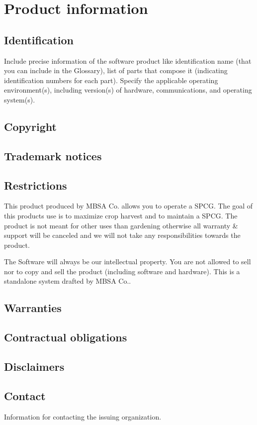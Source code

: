 \chapter{Product information}
\vspace{-6em}


\section{Identification}
Include precise information of the software product like identification name (that you can include in the \gls{Glossary}), list of parts that compose it (indicating identification numbers for each part). 
Specify the applicable operating environment(s), including version(s) of hardware, communications, and operating system(s).

\section{Copyright}

\section{Trademark notices}

\section{Restrictions}
This product produced by MBSA Co. allows you to operate a SPCG. The goal of this products use is to maximize crop harvest and to maintain a SPCG. The product is not meant for other uses than gardening otherwise all warranty & support will be canceled and we will not take any responsibilities towards the product.

The Software will always be our intellectual property. You are not allowed to sell nor to copy and sell the product (including software and hardware). This is a standalone system drafted by MBSA Co..

\section{Warranties}

\section{Contractual obligations}

\section{Disclaimers}

\section{Contact}
Information for contacting the issuing organization.